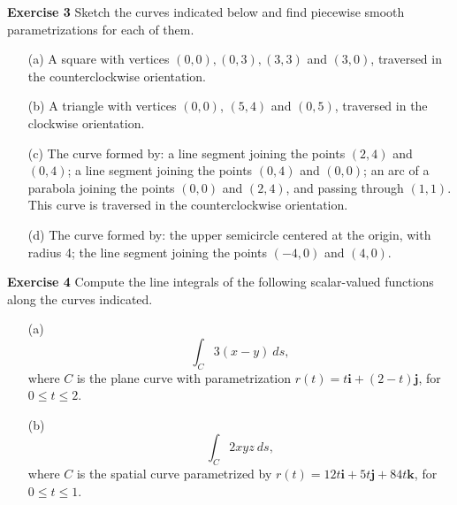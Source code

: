 \documentclass[12pt,oneside]{exam}
\newenvironment{exercise}[1]{\vspace{.1in}\noindent\textbf{Exercise #1 \hspace{.05em}}}{}
\begin{document}
\begin{exercise}{3}
Sketch the curves indicated below and find piecewise smooth parametrizations for each of them.
\begin{itemize}
\item[(a)] A square with vertices $(0,0), (0,3), (3,3)$ and $(3,0)$, traversed in the counterclockwise orientation. 
\item[(b)] A triangle with vertices $(0,0)$, $(5,4)$ and $(0,5)$, traversed in the clockwise orientation. 
\item[(c)] The curve formed by: a line segment joining the points $(2,4)$ and $(0,4)$; a line segment joining the points $(0,4)$ and $(0,0)$; an arc of a parabola joining the points $(0,0)$ and $(2,4)$, and passing through $(1,1)$. This curve is traversed in the counterclockwise orientation. 
\item[(d)] The curve formed by: the upper semicircle centered at the origin, with radius 4; the line segment joining the points $(-4,0)$ and $(4,0)$. 
\end{itemize}
\end{exercise}

\begin{exercise}{4}
Compute the line integrals of the following scalar-valued functions along the curves indicated. 
\begin{itemize}
\item[(a)] 
\begin{equation*}
\int_{C} 3(x-y) \ ds,
\end{equation*}
where $C$ is the plane curve with parametrization $r(t)=t\textbf{i}+(2-t)\textbf{j}$, for $0 \leq t \leq 2$. 
\item[(b)] 
\begin{equation*}
\int_{C} 2xyz \ ds,
\end{equation*}
where $C$ is the spatial curve parametrized by $r(t)=12t \textbf{i}+ 5t \textbf{j} + 84t \textbf{k}$, for $0 \leq t \leq 1$. 
\end{itemize}
\end{exercise}
\end{document}
